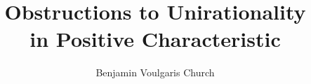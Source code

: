 \documentclass[12pt]{report}
\begin{document}
\title{Obstructions to Unirationality\\
            in Positive Characteristic}
\author{Benjamin Voulgaris Church}


\beforepreface


\afterpreface

%
%







\appendix





\onlinesignature
\end{document}
